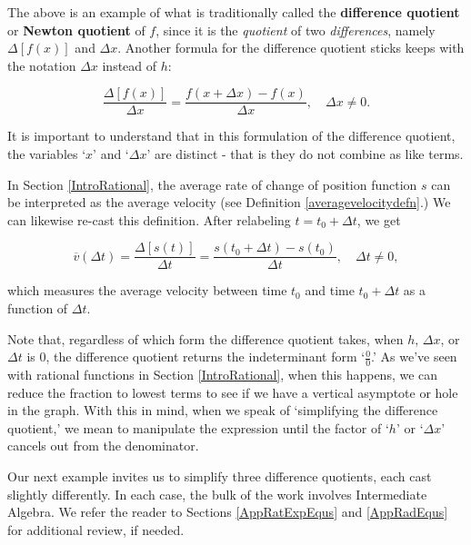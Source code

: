 The above is an example of what is traditionally called the  \textbf{difference quotient}  or  \textbf{Newton quotient} of $f$, since it is the \textit{quotient} of two \textit{differences}, namely $\Delta[f(x)]$ and $\Delta x$. Another formula for the difference quotient sticks keeps with the notation $\Delta x$ instead of $h$:


\[ \dfrac{\Delta[f(x)]}{\Delta x} = \dfrac{f(x+\Delta x)-f(x)}{\Delta x}, \quad \Delta x \neq 0.\]


It is important to understand that in this formulation of the difference quotient, the variables `$x$' and `$\Delta x$' are distinct - that is they do not combine as like terms. 

In Section \ref{IntroRational},   the average rate of change of  position function $s$ can be interpreted as the average velocity (see Definition  \ref{averagevelocitydefn}.)  We can likewise re-cast this definition.  After relabeling $t = t_{0}+ \Delta t$, we get

\[ \overline{v}(\Delta t) = \dfrac{\Delta [s(t)]}{\Delta t} = \dfrac{s(t_{0} + \Delta t) - s(t_{0})}{\Delta t}, \quad \Delta t \neq 0, \]

which measures the average velocity between time $t_{0}$ and time $t_{0} + \Delta t$ as a function of $\Delta t$.

Note that, regardless of which form the difference quotient takes, when $h$,  $\Delta x$, or  $\Delta t$ is $0$, the difference quotient returns the indeterminant form `$\frac{0}{0}$.' As we've seen with rational functions in Section \ref{IntroRational}, when this happens, we can reduce the fraction to lowest terms to see if we have a vertical asymptote or hole in the graph.  With this in mind,  when we speak of `simplifying the difference quotient,' we mean to manipulate the expression until the factor of `$h$' or `$\Delta x$' cancels out from the denominator. 

Our next example invites us to simplify three difference quotients, each cast slightly differently.  In each case, the bulk of the work involves Intermediate Algebra. We refer the reader to Sections \ref{AppRatExpEqus} and \ref{AppRadEqus} for additional review, if needed.

